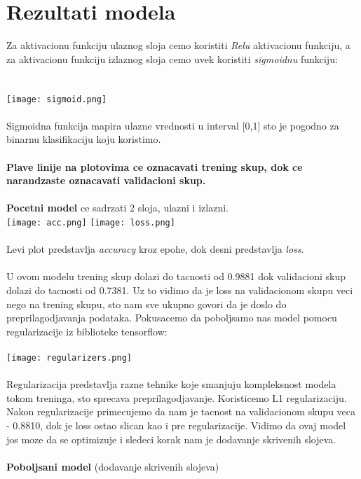 \documentclass{article}
\begin{document}
 \newpage
\section{Rezultati modela}
Za aktivacionu funkciju ulaznog sloja cemo koristiti \textit{Relu} aktivacionu funkciju, a za aktivacionu funkciju izlaznog sloja cemo uvek koristiti \textit{sigmoidnu} funkciju: \\
\\
\\
 \texttt{[image: sigmoid.png]}\\
\\
Sigmoidna funkcija mapira ulazne vrednosti u interval [0,1] sto je pogodno za binarnu klasifikaciju koju koristimo.\\
\\
\textbf{Plave linije na plotovima ce oznacavati trening skup, dok ce narandzaste oznacavati validacioni skup.}\\
\\
\textbf{Pocetni model} ce sadrzati 2 sloja, ulazni i izlazni. \\
\texttt{[image: acc.png]}
\texttt{[image: loss.png]}\\
\\
Levi plot predstavlja \textit{accuracy} kroz epohe, dok desni predstavlja \textit{loss}.\\
\\
U ovom modelu trening skup dolazi do tacnosti od 0.9881 dok validacioni skup dolazi do tacnosti od 0.7381.
Uz to vidimo da je loss na validacionom skupu veci nego na trening skupu, sto nam sve ukupno govori da je doslo do preprilagodjavanja podataka. Pokusacemo da poboljsamo nas model pomocu regularizacije iz biblioteke tensorflow:\\
\\
\texttt{[image: regularizers.png]}\\
\\
Regularizacija predstavlja razne tehnike koje smanjuju kompleksnost modela tokom treninga, sto sprecava preprilagodjavanje. Koristicemo L1 regularizaciju.\\
Nakon regularizacije primecujemo da nam je tacnost na validacionom skupu veca - 0.8810, dok je loss ostao slican kao i pre regularizacije. Vidimo da ovaj model jos moze da se optimizuje i sledeci korak nam je dodavanje skrivenih slojeva.\\
\\
\textbf{Poboljsani model} (dodavanje skrivenih slojeva)\\ 
\end{document}
